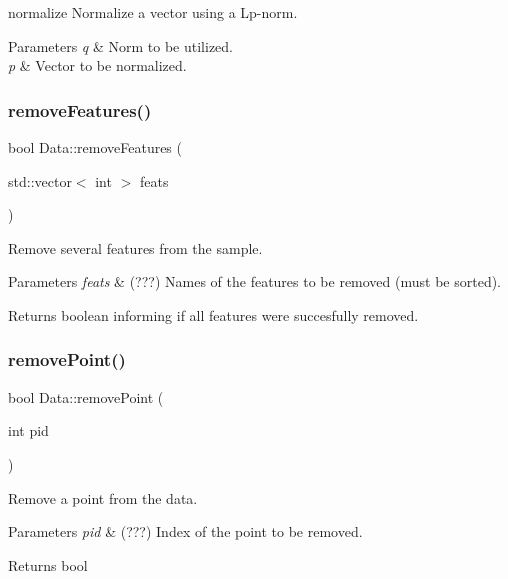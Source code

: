 normalize Normalize a vector using a Lp-\/norm. 


\begin{DoxyParams}{Parameters}
{\em q} & Norm to be utilized. \\
\hline
{\em p} & Vector to be normalized. \\
\hline
\end{DoxyParams}
\mbox{\label{class_data_a0e0136f31687452ff10b489f8804ceb8}} 
\subsubsection{\texorpdfstring{remove\+Features()}{removeFeatures()}}
{\footnotesize\ttfamily bool Data\+::remove\+Features (\begin{DoxyParamCaption}\item[{std\+::vector$<$ int $>$}]{feats }\end{DoxyParamCaption})}



Remove several features from the sample. 


\begin{DoxyParams}{Parameters}
{\em feats} & (???) Names of the features to be removed (must be sorted). \\
\hline
\end{DoxyParams}
\begin{DoxyReturn}{Returns}
boolean informing if all features were succesfully removed. 
\end{DoxyReturn}
\mbox{\label{class_data_ad927494a13a5018ff3644212d7234a03}} 
\subsubsection{\texorpdfstring{remove\+Point()}{removePoint()}}
{\footnotesize\ttfamily bool Data\+::remove\+Point (\begin{DoxyParamCaption}\item[{int}]{pid }\end{DoxyParamCaption})}



Remove a point from the data. 


\begin{DoxyParams}{Parameters}
{\em pid} & (???) Index of the point to be removed. \\
\hline
\end{DoxyParams}
\begin{DoxyReturn}{Returns}
bool 
\end{DoxyReturn}
\mbox{\label{class_data_a6cc376e614e5440061c66833e1c8d30a}} 
